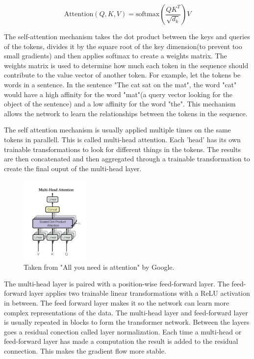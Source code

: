 \documentclass[11pt]{article}
\begin{document}
$$\text{Attention}(Q, K , V) = \text{softmax}(\frac{QK^T}{\sqrt{d_k}})V$$

The self-attention mechanism takes the dot product between the keys and queries of the tokens, divides it by the square root of the key dimension(to prevent too small gradients) and then applies softmax to create a weights matrix. The weights matrix is used to determine how much each token in the sequence should contribute to the value vector of another token. For example, let the tokens be words in a sentence. In the sentence "The cat sat on the mat", the word "cat" would have a high affinity for the word "mat"(a query vector looking for the object of the sentence) and a low affinity for the word "the". This mechanism allows the network to learn the relationships between the tokens in the sequence.

The self attention mechanism is usually applied multiple times on the same tokens in parallell. This is called multi-head attention. Each 'head' has its own trainable transformations to look for different things in the tokens. The results are then concatenated and then aggregated through a trainable transformation to create the final ouput of the multi-head layer.

\begin{figure}[h]
\centering
\includegraphics[width=0.3\textwidth]{multi-head.png}
\caption{Taken from "All you need is attention" by Google. }
\label{fig:lorenz_attractor}
\end{figure}

The multi-head layer is paired with a position-wise feed-forward layer. The feed-forward layer applies two trainable linear transformations with a ReLU activation in between. The feed forward layer makes it so the network can learn more complex representations of the data. The multi-head layer and feed-forward layer is usually repeated in blocks to form the transformer network. Between the layers goes a residual conection called layer normalization. Each time a multi-head or feed-forward layer has made a computation the result is added to the residual connection. This makes the gradient flow more stable.
\end{document}
